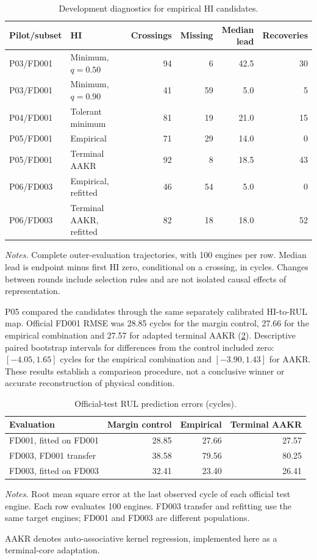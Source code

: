 \documentclass[preprint,12pt]{elsarticle}
\newcommand{\tablenotes}[1]{\par\smallskip\begin{minipage}{\linewidth}\footnotesize\raggedright\setlength{\parindent}{0pt}\setlength{\parskip}{0.35\baselineskip}\textit{Notes.} #1\end{minipage}}
\begin{document}
\begin{table}[htbp]
\centering
\caption{Development diagnostics for empirical HI candidates.}
\label{tab:hi-terminal-development}
\footnotesize
\setlength{\tabcolsep}{3.5pt}
\setlength{\tabcolsep}{3pt}
\begin{tabularx}{\linewidth}{@{}lXrrrr@{}}
\toprule
Pilot/subset & HI & Crossings & Missing & \shortstack{Median\\lead} & Recoveries \\
\midrule
P03/FD001 & Minimum, $q=0.50$ & 94 & 6 & 42.5 & 30 \\
P03/FD001 & Minimum, $q=0.90$ & 41 & 59 & 5.0 & 5 \\
P04/FD001 & Tolerant minimum & 81 & 19 & 21.0 & 15 \\
P05/FD001 & Empirical & 71 & 29 & 14.0 & 0 \\
P05/FD001 & Terminal AAKR & 92 & 8 & 18.5 & 43 \\
P06/FD003 & Empirical, refitted & 46 & 54 & 5.0 & 0 \\
P06/FD003 & Terminal AAKR, refitted & 82 & 18 & 18.0 & 52 \\
\bottomrule
\end{tabularx}
\tablenotes{Complete outer-evaluation trajectories, with 100 engines per row. Median lead is endpoint minus first HI zero, conditional on a crossing, in cycles. Changes between rounds include selection rules and are not isolated causal effects of representation.}
\end{table}

P05 compared the candidates through the same separately calibrated HI-to-RUL map. Official FD001 RMSE was 28.85 cycles for the margin control, 27.66 for the empirical combination and 27.57 for adapted terminal AAKR (\cref{tab:hi-prognostic-comparison}). Descriptive paired bootstrap intervals for differences from the control included zero: $[-4.05,1.65]$ cycles for the empirical combination and $[-3.90,1.43]$ for AAKR. These results establish a comparison procedure, not a conclusive winner or accurate reconstruction of physical condition.

\begin{table}[htbp]
\centering
\caption{Official-test RUL prediction errors (cycles).}
\label{tab:hi-prognostic-comparison}
\footnotesize
\setlength{\tabcolsep}{3pt}
\begin{tabularx}{\linewidth}{@{}Xrrr@{}}
\toprule
Evaluation & Margin control & Empirical & Terminal AAKR \\
\midrule
FD001, fitted on FD001 & 28.85 & 27.66 & 27.57 \\
FD003, FD001 transfer & 38.58 & 79.56 & 80.25 \\
FD003, fitted on FD003 & 32.41 & 23.40 & 26.41 \\
\bottomrule
\end{tabularx}
\tablenotes{Root mean square error at the last observed cycle of each official test engine. Each row evaluates 100 engines. FD003 transfer and refitting use the same target engines; FD001 and FD003 are different populations.

AAKR denotes auto-associative kernel regression, implemented here as a terminal-core adaptation.}
\end{table}
\end{document}
